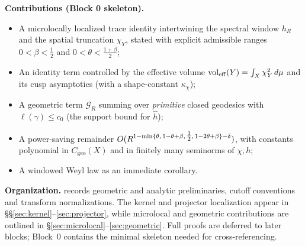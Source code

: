\smallskip
\noindent\textbf{Contributions (Block 0 skeleton).}
\begin{itemize}
  \item A microlocally localized trace identity intertwining the spectral window
        $h_R$ and the spatial truncation $\chi_Y$, stated with explicit admissible
        ranges $0<\beta<\tfrac12$ and $0<\theta<\tfrac{1+\beta}{2}$;
  \item An identity term controlled by the effective volume
        $\operatorname{vol}_{\mathrm{eff}}(Y)=\int_X \chi_Y^2\,d\mu$ and its cusp asymptotics
        (with a shape-constant $\kappa_\chi$);
  \item A geometric term $\mathcal{G}_R$ summing over \emph{primitive} closed
        geodesics with $\ell(\gamma)\le c_0$ (the support bound for $\widehat{h}$);
  \item A power-saving remainder $O(R^{1-\min\{\theta,\,1-\theta+\beta,\,\tfrac{1}{2},\,1-2\theta+\beta\}-\delta})$, with constants polynomial in
        $C_{\mathrm{geo}}(X)$ and in finitely many seminorms of $\chi,h$;
  \item A windowed Weyl law as an immediate corollary.
\end{itemize}

\smallskip
\noindent\textbf{Organization.}
 records geometric and analytic preliminaries,
cutoff conventions and transform normalizations. The kernel and projector
localization appear in \S\S\ref{sec:kernel}--\ref{sec:projector}, while
microlocal and geometric contributions are outlined in
\S\ref{sec:microlocal}--\ref{sec:geometric}. Full proofs are deferred to later
blocks; Block~0 contains the minimal skeleton needed for cross-referencing.

